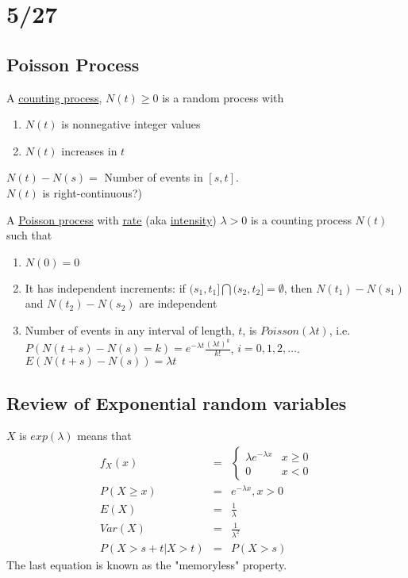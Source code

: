 \section*{5/27}
  \subsection*{Poisson Process}
    A \underline{counting process}, $N(t) \ge 0$ is a random process with
    \begin{enumerate}
      \item $N(t)$ is nonnegative integer values
      \item $N(t)$ increases in $t$
    \end{enumerate}
    $N(t) - N(s) = $ Number of events in $[s, t]$.\\
    $N(t)$ is right-continuous?)\\
    \begin{definition}
      A \underline{Poisson process} with \underline{rate} (aka 
      \underline{intensity}) $\lambda > 0$ is a counting process $N(t)$ such
      that
      \begin{enumerate}
        \item $N(0) = 0$
        \item It has independent increments: if $(s_1, t_1] \bigcap (s_2, t_2]
          = \emptyset$, then $N(t_1) - N(s_1)$ and $N(t_2) - N(s_2)$ are 
          independent
        \item Number of events in any interval of length, $t$, is 
          $Poisson(\lambda t)$, i.e. $P(N(t+s) - N(s) = k) = e^{-\lambda t}
          \frac{(\lambda t)^k}{k!}$, $i = 0, 1, 2, \ldots$. $E(N(t + s) - N(s))
          = \lambda t$
      \end{enumerate}
    \end{definition}
    
  \subsection*{Review of Exponential random variables}
    $X$ is $exp(\lambda)$ means that
    \begin{eqnarray*}
      f_X(x) & = & \begin{cases} \lambda e^{-\lambda x} & x \ge 0\\ 0 & x < 0 \end{cases}\\
      P(X \ge x) & = & e^{-\lambda x}, x > 0\\
      E(X) & = & \frac{1}{\lambda}\\
      Var(X) & = & \frac{1}{\lambda^2}\\
      P(X > s + t | X > t) & = & P(X > s)
    \end{eqnarray*}
    The last equation is known as the "memoryless" property.

